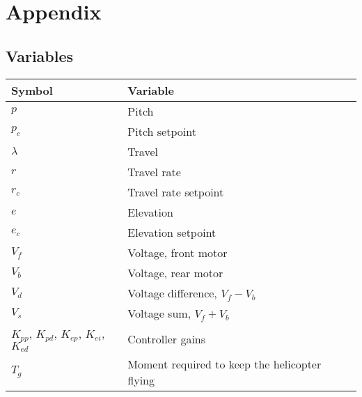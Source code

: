 \section{Appendix}
\subsection{Variables}
\begin{center}
\begin{tabular}{l l l l}
\hline 
Symbol & Variable \\ \hline
$p$ & Pitch \\
$p_c$ & Pitch setpoint \\
$\lambda$ & Travel \\
$r$ & Travel rate \\
$r_c$ & Travel rate setpoint \\
$e$ & Elevation \\
$e_c$ & Elevation setpoint \\
$V_f$ & Voltage, front motor \\
$V_b$ & Voltage, rear motor \\
$V_d$ & Voltage difference, $V_f -V_b$ \\
$V_s$ & Voltage sum, $V_f + V_b$ \\
$K_{pp}$, $K_{pd}$, $K_{ep}$, $K_{ei}$, $K_{ed}$ & Controller gains \\
$T_g$ & Moment required to keep the helicopter flying
\end{tabular}
\end{center}
\label{table:variables}



\vspace{1cm}

